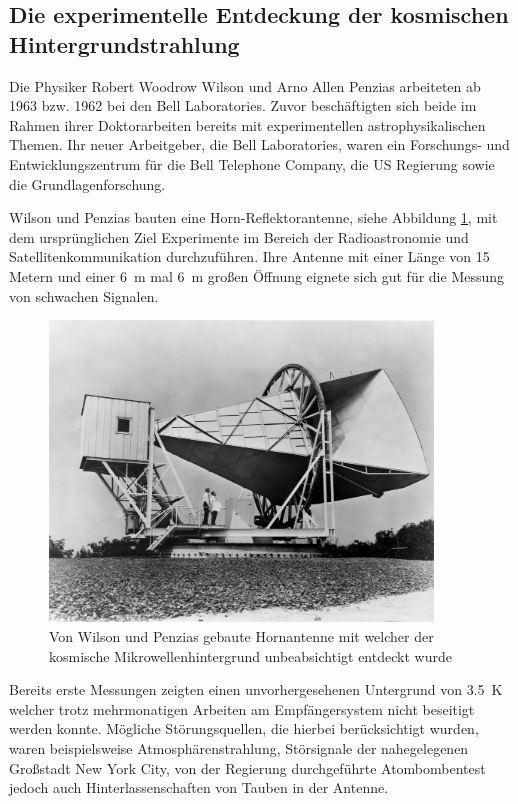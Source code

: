 \subsection{Die experimentelle Entdeckung der kosmischen Hintergrundstrahlung}

Die Physiker Robert Woodrow Wilson und Arno Allen Penzias arbeiteten ab 1963 bzw. 1962 bei den Bell Laboratories.
Zuvor beschäftigten sich beide im Rahmen ihrer Doktorarbeiten bereits mit experimentellen astrophysikalischen Themen.
Ihr neuer Arbeitgeber, die Bell Laboratories, waren ein Forschungs- und Entwicklungszentrum für die Bell Telephone Company, die US Regierung sowie die Grundlagenforschung.

Wilson und Penzias bauten eine Horn-Reflektorantenne, siehe Abbildung \ref{fig:cmb}, mit dem ursprünglichen Ziel Experimente im Bereich der Radioastronomie und Satellitenkommunikation durchzuführen. 
Ihre Antenne mit einer Länge von 15 Metern und einer \SI{6}{\metre} mal \SI{6}{\metre} großen Öffnung eignete sich gut für die Messung von schwachen Signalen.

\begin{figure}
  \centering
  \includegraphics[height=8.0cm]{ressources/cmb.jpg}
  \caption{Von Wilson und Penzias gebaute Hornantenne mit welcher der kosmische Mikrowellenhintergrund unbeabsichtigt entdeckt wurde \cite{cmb}}
  \label{fig:cmb}
\end{figure}

Bereits erste Messungen zeigten einen unvorhergesehenen Untergrund von \SI{3.5}{\kelvin} welcher trotz mehrmonatigen Arbeiten am Empfängersystem nicht beseitigt werden konnte.
Mögliche Störungsquellen, die hierbei berücksichtigt wurden, waren beispielsweise Atmosphärenstrahlung, Störsignale der nahegelegenen Großstadt New York City, von der Regierung durchgeführte Atombombentest jedoch auch Hinterlassenschaften von Tauben in der Antenne.

